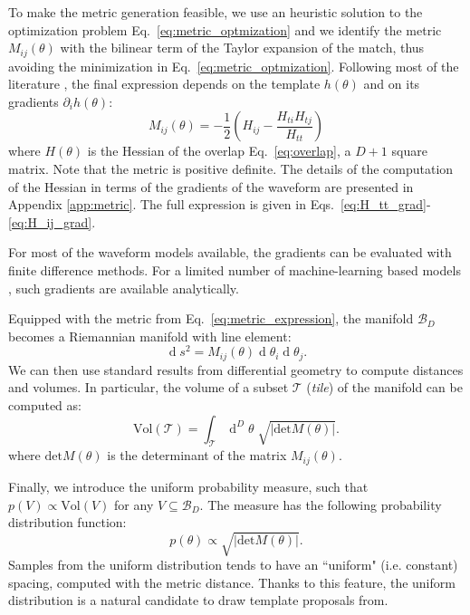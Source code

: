 \documentclass[twocolumn,showpacs,preprintnumbers,nofootinbib,prd,
superscriptaddress,10pt]{revtex4-2}
\renewcommand{\d}[1]{\ensuremath{\operatorname{d}\!{#1}}}
\newcommand{\dvol}[2]{\ensuremath{\operatorname{d}^{#2}\!{#1}}}
\begin{document}
To make the metric generation feasible, we use an heuristic solution to the optimization problem Eq.~\eqref{eq:metric_optmization} and we identify the metric $M_{ij}(\theta)$ with the bilinear term of the Taylor expansion of the match, thus avoiding the minimization in Eq.~\eqref{eq:metric_optmization}.
Following most of the literature \cite{owen_metric, Messenger:2008ta}, the final expression depends on the template $h(\theta)$ and on its gradients $\partial_i h(\theta)$:
\begin{equation}\label{eq:metric_expression}
	M_{ij}(\theta) = - \frac{1}{2} \left( H_{ij} - \frac{H_{ti}H_{tj}}{H_{tt}} \right)
\end{equation}
where $H(\theta)$ is the Hessian of the overlap Eq.~\eqref{eq:overlap}, a $D+1$ square matrix.
Note that the metric is positive definite. The details of the computation of the Hessian in terms of the gradients of the waveform are presented in Appendix \ref{app:metric}. The full expression is given in Eqs.~\eqref{eq:H_tt_grad}-\eqref{eq:H_ij_grad}.

For most of the waveform models available, the gradients can be evaluated with finite difference methods. For a limited number of machine-learning based models \cite{Khan:2020fso, PhysRevD.103.043020, ML_wf_model, Tissino:2022thn}, such gradients are available analytically.

Equipped with the metric from Eq.~\eqref{eq:metric_expression}, the manifold $\mathcal{B}_D$ becomes a Riemannian manifold with line element:
\begin{equation}\label{eq:line_element}
	\d{s^2} = M_{ij}(\theta) \d{\theta_i} \d{\theta_j}.
\end{equation}
We can then use standard results from differential geometry to compute distances and volumes. In particular, the volume of a subset $\mathcal{T}$ ({\it tile}) of the manifold can be computed as:
\begin{equation}\label{eq:volume_tile}
	\text{Vol}(\mathcal{T}) = \int_\mathcal{T} \dvol{\theta}{D} \; \sqrt{| \text{det}M(\theta)|}.
\end{equation}
where $\text{det}M(\theta)$ is the determinant of the matrix $M_{ij}(\theta)$.

Finally, we introduce the uniform probability measure, such that $p(V) \propto \text{Vol}(V)$ for any $V\subseteq \mathcal{B}_D$. The measure has the following probability distribution function:
\begin{equation}\label{eq:pdf_uniform}
	p(\theta) \propto \sqrt{|\text{det}M(\theta)|}.
\end{equation}
Samples from the uniform distribution tends to have an ``uniform" (i.e. constant) spacing, computed with the metric distance. Thanks to this feature, the uniform distribution is a natural candidate to draw template proposals from.
\end{document}

